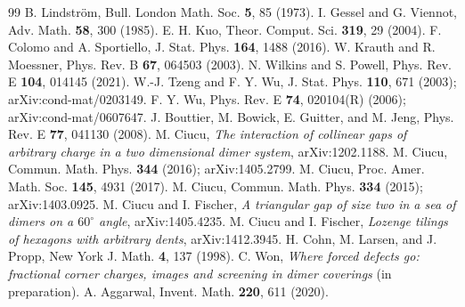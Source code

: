\documentclass[aps,pre,twocolumn,superscriptaddress,nofootinbib,floatfix]{revtex4-2}
\begin{document}
\begin{thebibliography}{99}
 B. Lindstr\"om, Bull. London Math. Soc. \textbf{5}, 85 (1973).
 I. Gessel and G. Viennot, Adv. Math. \textbf{58}, 300 (1985).
 E. H. Kuo, Theor. Comput. Sci. \textbf{319}, 29 (2004).
 F. Colomo and A. Sportiello, J. Stat. Phys. \textbf{164}, 1488 (2016).
 W. Krauth and R. Moessner, Phys. Rev. B \textbf{67}, 064503 (2003).
 N. Wilkins and S. Powell, Phys. Rev. E \textbf{104}, 014145 (2021).
 W.-J. Tzeng and F. Y. Wu, J. Stat. Phys. \textbf{110}, 671 (2003); arXiv:cond-mat/0203149.
 F. Y. Wu, Phys. Rev. E \textbf{74}, 020104(R) (2006); arXiv:cond-mat/0607647.
 J. Bouttier, M. Bowick, E. Guitter, and M. Jeng, Phys. Rev. E \textbf{77}, 041130 (2008).
 M. Ciucu, \emph{The interaction of collinear gaps of arbitrary charge in a two dimensional dimer system}, arXiv:1202.1188.
 M. Ciucu, Commun. Math. Phys. \textbf{344} (2016); arXiv:1405.2799.
 M. Ciucu, Proc. Amer. Math. Soc. \textbf{145}, 4931 (2017).
 M. Ciucu, Commun. Math. Phys. \textbf{334} (2015); arXiv:1403.0925.
 M. Ciucu and I. Fischer, \emph{A triangular gap of size two in a sea of dimers on a $60^\circ$ angle}, arXiv:1405.4235.
 M. Ciucu and I. Fischer, \emph{Lozenge tilings of hexagons with arbitrary dents}, arXiv:1412.3945.
 H. Cohn, M. Larsen, and J. Propp, New York J. Math. \textbf{4}, 137 (1998).
 C. Won, \emph{Where forced defects go: fractional corner charges, images and screening in dimer coverings} (in preparation).
 A. Aggarwal, Invent. Math. \textbf{220}, 611 (2020).
\end{thebibliography}
\end{document}
